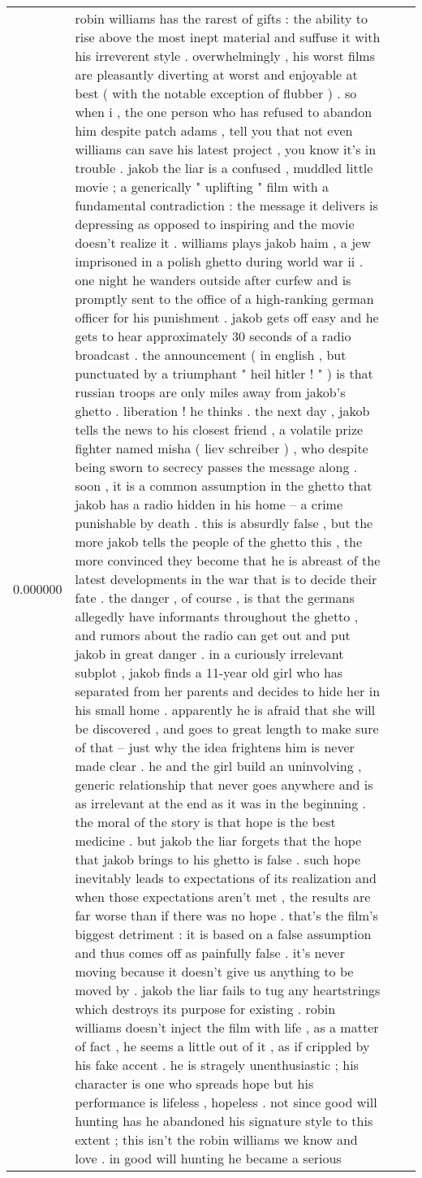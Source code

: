 \begin{tabular}{r{1cm} p{0.4in} r{1cm} p{0.4in}}
0.000000 & robin williams has the rarest of gifts : the ability to rise above the most inept material and suffuse it with his irreverent style .  overwhelmingly , his worst films are pleasantly diverting at worst and enjoyable at best ( with the notable exception of flubber ) .  so when i , the one person who has refused to abandon him despite patch adams , tell you that not even williams can save his latest project , you know it's in trouble .  jakob the liar is a confused , muddled little movie ; a generically " uplifting " film with a fundamental contradiction : the message it delivers is depressing as opposed to inspiring and the movie doesn't realize it .  williams plays jakob haim , a jew imprisoned in a polish ghetto during world war ii .  one night he wanders outside after curfew and is promptly sent to the office of a high-ranking german officer for his punishment .  jakob gets off easy and he gets to hear approximately 30 seconds of a radio broadcast .  the announcement ( in english , but punctuated by a triumphant " heil hitler ! " ) is that russian troops are only miles away from jakob's ghetto .  liberation ! he thinks .  the next day , jakob tells the news to his closest friend , a volatile prize fighter named misha ( liev schreiber ) , who despite being sworn to secrecy passes the message along .  soon , it is a common assumption in the ghetto that jakob has a radio hidden in his home -- a crime punishable by death .  this is absurdly false , but the more jakob tells the people of the ghetto this , the more convinced they become that he is abreast of the latest developments in the war that is to decide their fate .  the danger , of course , is that the germans allegedly have informants throughout the ghetto , and rumors about the radio can get out and put jakob in great danger .  in a curiously irrelevant subplot , jakob finds a 11-year old girl who has separated from her parents and decides to hide her in his small home .  apparently he is afraid that she will be discovered , and goes to great length to make sure of that -- just why the idea frightens him is never made clear .  he and the girl build an uninvolving , generic relationship that never goes anywhere and is as irrelevant at the end as it was in the beginning .  the moral of the story is that hope is the best medicine .  but jakob the liar forgets that the hope that jakob brings to his ghetto is false .  such hope inevitably leads to expectations of its realization and when those expectations aren't met , the results are far worse than if there was no hope .  that's the film's biggest detriment : it is based on a false assumption and thus comes off as painfully false .  it's never moving because it doesn't give us anything to be moved by .  jakob the liar fails to tug any heartstrings which destroys its purpose for existing .  robin williams doesn't inject the film with life , as a matter of fact , he seems a little out of it , as if crippled by his fake accent .  he is stragely unenthusiastic ; his character is one who spreads hope but his performance is lifeless , hopeless .  not since good will hunting has he abandoned his signature style to this extent ; this isn't the robin williams we know and love .  in good will hunting he became a serious 
\end{tabular}
